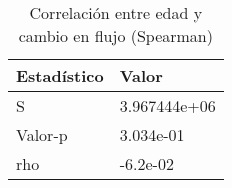 \begin{table}[ht]
\centering
\caption{Correlación entre edad y cambio en flujo (Spearman)} 
\label{tab:correlacion_flujo}
\begin{tabular}{ll}
  \hline
Estadístico & Valor \\ 
  \hline
S & 3.967444e+06 \\ 
  Valor-p & 3.034e-01 \\ 
  rho & -6.2e-02 \\ 
   \hline
\end{tabular}
\end{table}
